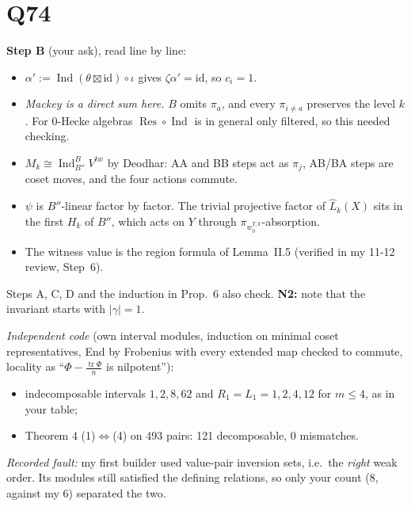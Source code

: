 \documentclass[11pt]{article}
\newcommand{\Ind}{\operatorname{Ind}}
\newcommand{\Res}{\operatorname{Res}}
\begin{document}
\section{Q74}
\textbf{Step B} (your ask), read line by line:
\begin{itemize}[nosep]
\item $\alpha':=\Ind(\theta\boxtimes\mathrm{id})\circ\iota$ gives $\zeta\alpha'=\mathrm{id}$, so $c_i=1$.
\item \emph{Mackey is a direct sum here.} $B$ omits $\pi_a$, and every $\pi_{i\ne a}$ preserves the level $k$. For 0-Hecke algebras $\Res\circ\Ind$ is in general only filtered, so this needed checking.
\item $M_k\cong\Ind_{B''}^BV^{tw}$ by Deodhar: AA and BB steps act as $\pi_j$, AB/BA steps are coset moves, and the four actions commute.
\item $\psi$ is $B''$-linear factor by factor. The trivial projective factor of $\hat L_k(X)$ sits in the first $H_k$ of $B''$, which acts on $Y$ through $\pi_{w_0^{Y,k}}$-absorption.
\item The witness value is the region formula of Lemma~II.5 (verified in my 11-12 review, Step~6).\checkmark
\end{itemize}
Steps A, C, D and the induction in Prop.~6 also check. \textbf{N2:} note that the invariant starts with $|\gamma|=1$.

\emph{Independent code} (own interval modules, induction on minimal coset representatives, End by Frobenius with every extended map checked to commute, locality as ``$\Phi-\tfrac{\operatorname{tr}\Phi}{n}$ is nilpotent''):
\begin{itemize}[nosep]
\item indecomposable intervals $1,2,8,62$ and $R_1=L_1=1,2,4,12$ for $m\le4$, as in your table;
\item Theorem 4 (1)$\Leftrightarrow$(4) on 493 pairs: 121 decomposable, 0 mismatches.
\end{itemize}
\emph{Recorded fault:} my first builder used value-pair inversion sets, i.e.\ the \emph{right} weak order. Its modules still satisfied the defining relations, so only your count (8, against my 6) separated the two.
\end{document}
